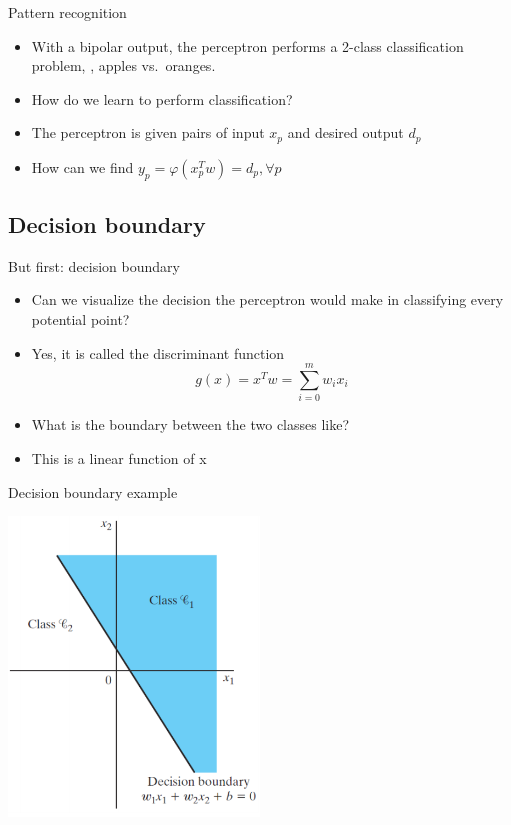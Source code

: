 \documentclass[notes]{beamer}
\providecommand{\tightlist}{%
  \setlength{\itemsep}{0pt}\setlength{\parskip}{0pt}}
\begin{document}
\begin{frame}{Pattern recognition}

\begin{itemize}
\tightlist
\item
  With a bipolar output, the perceptron performs a 2-class
  classification problem, \ie, apples vs.~oranges.
\item
  How do we learn to perform classification?
\item
  The perceptron is given pairs of input \(x_p\) and desired output
  \(d_p\)
\item
  How can we find \(y_p = \varphi (x_p^T w) =d_p, \forall p\)
\end{itemize}

\end{frame}

\subsection{Decision boundary}\label{decision-boundary}

\begin{frame}{But first: decision boundary}

\begin{itemize}
\tightlist
\item
  Can we visualize the decision the perceptron would make in classifying
  every potential point?
\item
  Yes, it is called the discriminant function
  \[g(x)=x^Tw=\sum_{i=0}^{m} w_i x_i\]
\item
  What is the boundary between the two classes like?
\item
  This is a linear function of x
\end{itemize}

\end{frame}

\begin{frame}{Decision boundary example}

\centering 

\includegraphics[width=0.50000\textwidth]{2018-03-08-22-28-01.png}\\

\end{frame}
\end{document}
